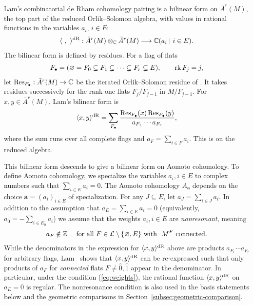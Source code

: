 Lam's combinatorial de Rham cohomology pairing is a bilinear form on
$\bar A^r(M)$, the top part of the reduced Orlik--Solomon algebra,
with values in rational functions in the variables $a_i$, $i\in E$:
\[
 \langle~,~\rangle^{\mathrm{dR}}:
 \bar A^r(M)\otimes_{\mathbb C}\bar A^r(M)
 \longrightarrow\mathbb C(a_i\mid i\in E).
\]
The bilinear form is defined by residues. For a flag of flats
\[
 F_\bullet=(\varnothing=F_0\subsetneq F_1\subsetneq\cdots
             \subsetneq F_r\subsetneq E),\qquad \operatorname{rk} F_j=j,
\]
let $\operatorname{Res}_{F_\bullet}:\bar A^r(M)\to\mathbb C$ be the iterated
Orlik--Solomon residue of \cite[Definition 5.2]{Lam}. It takes residues
successively for the rank-one flats $F_j/F_{j-1}$ in $M/F_{j-1}$.
For $x,y\in\bar A^r(M)$, Lam's bilinear form is
\begin{equation}\label{eq:combinatorial-deRham}
 \langle x,y\rangle^{\mathrm{dR}}
 =\sum_{F_\bullet}
   \frac{\operatorname{Res}_{F_\bullet}(x)\operatorname{Res}_{F_\bullet}(y)}
        {a_{F_1}\cdots a_{F_r}},
\end{equation}
where the sum runs over all complete flags and $a_F = \sum_{i\in F} a_i$. This is \cite[Definition 5.6 and Corollary 5.12]{Lam} on the reduced
algebra.

This bilinear form descends to give a bilinear form on Aomoto cohomology.  To define Aomoto cohomology, we specialize the variables $a_i, i \in E$ to complex numbers such that $\sum_{i\in E} a_i = 0$.  The Aomoto cohomology $A_{\mathbf a}$ depends on the choice $\mathbf a=(a_i)_{i\in E}$ of specialization.  For any $J \subseteq E$, let $a_J=\sum_{i\in J}a_i$.  In addition to the assumption that $a_E=\sum_{i\in E} a_i =0$ (equivalently, $a_0=-\sum_{i\in E_0}a_i$) we assume that the weights $a_i, i\in E$ are \emph{nonresonant}, meaning
\begin{equation}\label{eq:weights}
 a_F\notin\ZM\quad
 \text{ for all }F\in\cL\setminus\{\varnothing,E\}\text{ with }\ M^F\text{ connected}.
\end{equation}
While the denominators in the expression for $\langle x,y\rangle^{\mathrm{dR}}$ above are products ${a_{F_1}\cdots a_{F_r}}$ for arbitrary flags, Lam~\cite[Corollary 10.25]{Lam} shows that $\langle x,y\rangle^{\mathrm{dR}}$ can be re-expressed such that only products of $a_F$ for \emph{connected} flats $F \neq \hat 0, \hat 1$ appear in the denominator.  In particular, under the condition (\ref{eq:weights}), the rational function $\langle x,y\rangle^{\mathrm{dR}}$ on $a_E=0$ is regular.
The nonresonance condition is also used in the basis statements below and the geometric comparisons in
Section~\ref{subsec:geometric-comparison}.

